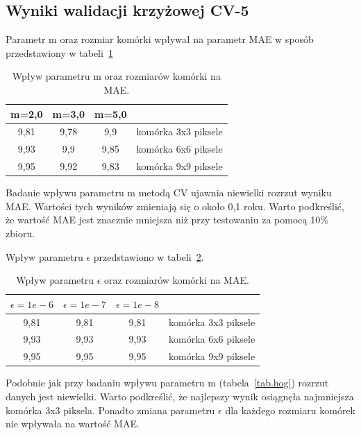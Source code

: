 \documentclass[a4paper,twoside,12pt]{book}
\begin{document}
    \subsection*{Wyniki walidacji krzyżowej CV-5}
    Parametr m oraz rozmiar komórki wpływał na parametr MAE w sposób przedstawiony w tabeli~\ref{tab.hog11}
    \begin{table}[h!]
        \centering
        \caption{Wpływ parametru m oraz rozmiarów komórki na MAE.}
        \begin{tabular}{|c|c|c|c|}
            \hline
            m=2,0 & m=3,0 & m=5,0 &                     \\ \hline
            9,81 & 9,78 & 9,9 & komórka 3x3 piksele \\ \hline
            9,93 & 9,9 & 9,85 & komórka 6x6 piksele \\ \hline
            9,95 & 9,92 & 9,83 & komórka 9x9 piksele \\ \hline
        \end{tabular}
        \label{tab.hog11}
    \end{table}

    Badanie wpływu parametru m metodą CV ujawnia niewielki rozrzut wyniku MAE.
    Wartości tych wyników zmieniają się o około 0,1 roku. Warto podkreślić, że wartość MAE jest znacznie mniejsza niż
    przy testowaniu za pomocą 10\% zbioru.

    Wpływ parametru $\epsilon$ przedstawiono w tabeli~\ref{tab.hog12}.
    \begin{table}[h!]
        \centering
        \caption{Wpływ parametru $\epsilon$ oraz rozmiarów komórki na MAE.}
        \begin{tabular}{|c|c|c|c|}
            \hline
            $\epsilon=1e-6$ &  $\epsilon=1e-7$ &  $\epsilon=1e-8$ &                     \\ \hline
            9,81 & 9,81 & 9,81 & komórka 3x3 piksele \\ \hline
            9,93 & 9,93 & 9,93 & komórka 6x6 piksele \\ \hline
            9,95 & 9,95 & 9,95 & komórka 9x9 piksele \\ \hline
        \end{tabular}
        \label{tab.hog12}
    \end{table}

    Podobnie jak przy badaniu wpływu parametru m (tabela~\ref{tab.hog}) rozrzut danych jest niewielki. Warto
    podkreślić, że najlepszy wynik osiągnęła najmniejsza komórka 3x3 piksela. Ponadto zmiana parametru $\epsilon$ dla
    każdego rozmiaru komórek nie wpływała na wartość MAE.
\end{document}
